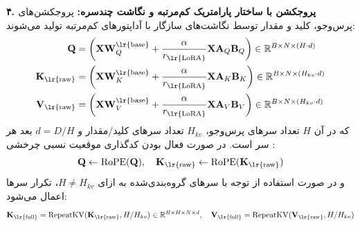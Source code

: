\textbf{۴. پروجکشن با ساختار پارامتریک کم‌مرتبه  و نگاشت چندسره:}
پروجکشن‌های پرس‌وجو، کلید و مقدار توسط نگاشت‌های سازگار با آداپتورهای کم‌مرتبه تولید می‌شوند:
\begin{align}
\mathbf{Q} &= \left(\mathbf{X} \mathbf{W}_Q^{\text{\lr{base}}} + \frac{\alpha}{r_{\text{\lr{LoRA}}}} \mathbf{X} \mathbf{A}_Q \mathbf{B}_Q\right) \in \mathbb{R}^{B \times N \times (H \cdot d)} \\
\mathbf{K}_{\text{\lr{raw}}} &= \left(\mathbf{X} \mathbf{W}_K^{\text{\lr{base}}} + \frac{\alpha}{r_{\text{\lr{LoRA}}}} \mathbf{X} \mathbf{A}_K \mathbf{B}_K\right) \in \mathbb{R}^{B \times N \times (H_{kv} \cdot d)} \\
\mathbf{V}_{\text{\lr{raw}}} &= \left(\mathbf{X} \mathbf{W}_V^{\text{\lr{base}}} + \frac{\alpha}{r_{\text{\lr{LoRA}}}} \mathbf{X} \mathbf{A}_V \mathbf{B}_V\right) \in \mathbb{R}^{B \times N \times (H_{kv} \cdot d)}
\end{align}
که در آن $H$ تعداد سرهای پرس‌وجو، $H_{kv}$ تعداد سرهای کلید/مقدار و $d = D/H$ بعد هر سر است. در صورت فعال بودن کدگذاری موقعیت نسبی چرخشی :
\begin{equation}
\mathbf{Q} \leftarrow \operatorname{RoPE}(\mathbf{Q}), \quad \mathbf{K}_{\text{\lr{raw}}} \leftarrow \operatorname{RoPE}(\mathbf{K}_{\text{\lr{raw}}})
\end{equation}
و در صورت استفاده از توجه با سرهای گروه‌بندی‌شده  به ازای $H \neq H_{kv}$، تکرار سرها اعمال می‌شود:
\begin{equation}
\mathbf{K}_{\text{\lr{full}}} = \operatorname{RepeatKV}(\mathbf{K}_{\text{\lr{raw}}}, H/H_{kv}) \in \mathbb{R}^{B \times H \times N \times d}, \quad \mathbf{V}_{\text{\lr{full}}} = \operatorname{RepeatKV}(\mathbf{V}_{\text{\lr{raw}}}, H/H_{kv})
\end{equation}

